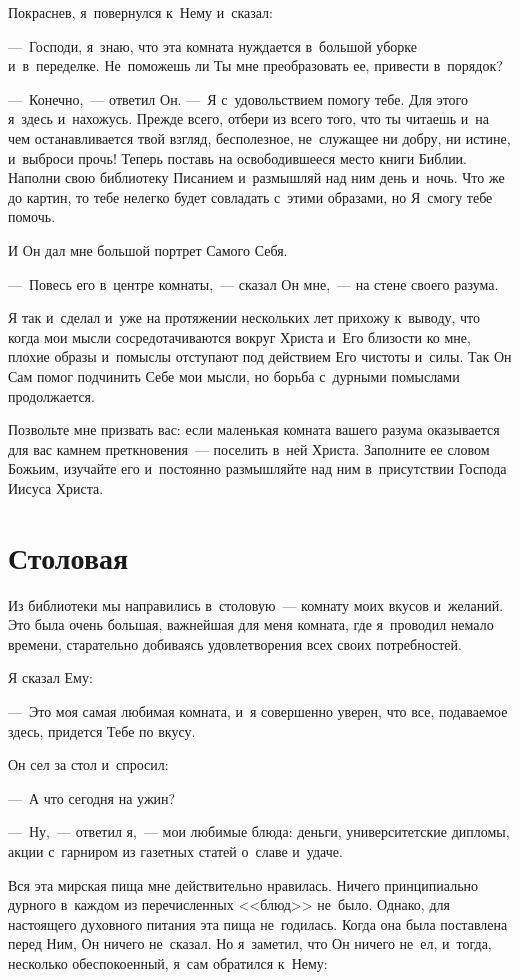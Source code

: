 \documentclass[12pt,article,a4paper,fittopage]{ncc}
\begin{document}
\begin{multicols}{2}
Покраснев, я~повернулся к~Нему и~сказал: 

---~Господи, я~знаю, что эта комната нуждается в~большой уборке и~в~переделке. Не~поможешь ли Ты мне преобразовать ее, привести в~порядок?

---~Конечно,~--- ответил Он. ---~Я с~удовольствием помогу тебе. Для этого я~здесь и~нахожусь. Прежде всего, отбери из всего того, что ты читаешь и~на чем останавливается твой взгляд, бесполезное, не~служащее ни добру, ни истине, и~выброси прочь! Теперь поставь на освободившееся место книги Библии. Наполни свою библиотеку Писанием и~размышляй над ним день и~ночь. Что же до картин, то тебе нелегко будет совладать с~этими образами, но Я~смогу тебе помочь. 

И Он дал мне большой портрет Самого Себя. 

---~Повесь его в~центре комнаты,~--- сказал Он мне,~--- на стене своего разума. 

Я так и~сделал и~уже на протяжении нескольких лет прихожу к~выводу, что когда мои мысли сосредотачиваются вокруг Христа и~Его близости ко мне, плохие образы и~помыслы отступают под действием Его чистоты и~силы. Так Он Сам помог подчинить Себе мои мысли, но борьба с~дурными помыслами продолжается.

Позвольте мне призвать вас: если маленькая комната вашего разума оказывается для вас камнем преткновения~--- поселить в~ней Христа. Заполните ее словом Божьим, изучайте его и~постоянно размышляйте над ним в~присутствии Господа Иисуса Христа.

\section*{Столовая}

Из библиотеки мы направились в~столовую~--- комнату моих вкусов и~желаний. Это была очень большая, важнейшая для меня комната, где я~проводил немало времени, старательно добиваясь удовлетворения всех своих потребностей.

Я сказал Ему: 

---~Это моя самая любимая комната, и~я совершенно уверен, что все, подаваемое здесь, придется Тебе по вкусу.

Он сел за стол и~спросил: 

---~А что сегодня на ужин?

---~Ну,~--- ответил я,~--- мои любимые блюда: деньги, университетские дипломы, акции с~гарниром из газетных статей о~славе и~удаче. 

Вся эта мирская пища мне действительно нравилась. Ничего принципиально дурного в~каждом из перечисленных <<блюд>> не~было. Однако, для настоящего духовного питания эта пища не~годилась. Когда она была поставлена перед Ним, Он ничего не~сказал. Но я~заметил, что Он ничего не~ел, и~тогда, несколько обеспокоенный, я~сам обратился к~Нему: 


\end{multicols}
\end{document}
